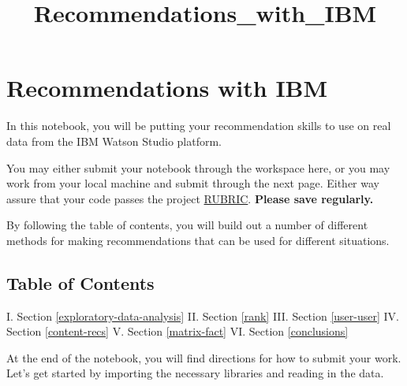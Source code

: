 \documentclass[11pt]{article}
\title{Recommendations\_with\_IBM}
\begin{document}
    
    
    \maketitle
    
    

    
    \hypertarget{recommendations-with-ibm}{%
\section{Recommendations with IBM}\label{recommendations-with-ibm}}

In this notebook, you will be putting your recommendation skills to use
on real data from the IBM Watson Studio platform.

You may either submit your notebook through the workspace here, or you
may work from your local machine and submit through the next page.
Either way assure that your code passes the project
\href{https://review.udacity.com/\#!/rubrics/2322/view}{RUBRIC}.
\textbf{Please save regularly.}

By following the table of contents, you will build out a number of
different methods for making recommendations that can be used for
different situations.

\hypertarget{table-of-contents}{%
\subsection{Table of Contents}\label{table-of-contents}}

I. Section \ref{exploratory-data-analysis} II. Section \ref{rank} III.
Section \ref{user-user} IV. Section \ref{content-recs} V.
Section \ref{matrix-fact} VI. Section \ref{conclusions}

At the end of the notebook, you will find directions for how to submit
your work. Let's get started by importing the necessary libraries and
reading in the data.
\end{document}
